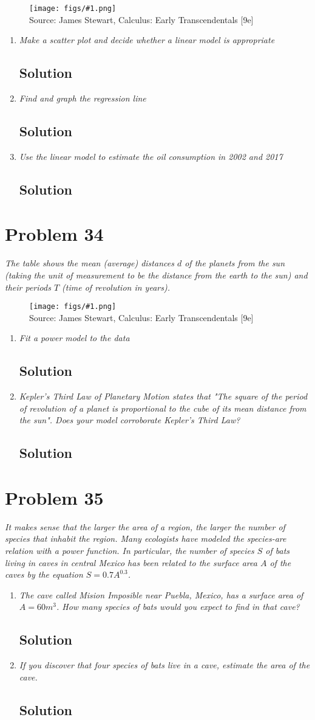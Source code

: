 \documentclass[11pt]{article}
\newcommand{\soln}{\subsection*}
\newcommand{\qn}{\textit}
\newcommand{\imagesource}[1]{{\footnotesize Source: #1}}
\newcommand{\imgqn}[1]{
	\begin{figure}[H]
		\centering
		\texttt{[image: figs/\#1.png]}\\
		\imagesource{James Stewart, Calculus: Early Transcendentals [9e]}
	\end{figure}
}
\begin{document}
\imgqn{1.2.33}

\begin{enumerate}
	\item \qn{Make a scatter plot and decide whether a linear model is appropriate}
	\soln{Solution}
	
	\item \qn{Find and graph the regression line}
	\soln{Solution}
	
	\item \qn{Use the linear model to estimate the oil consumption in 2002 and 2017}
	\soln{Solution}
\end{enumerate}

\section*{Problem 34}

\qn{The table shows the mean (average) distances $d$ of the planets from the sun (taking the unit of measurement to be the distance from the earth to the sun) and their periods $T$ (time of revolution in years).}

\imgqn{1.2.34}

\begin{enumerate}
	\item \qn{Fit a power model to the data}
	\soln{Solution}
	
	\item \qn{Kepler's Third Law of Planetary Motion states that "The square of the period of revolution of a planet is proportional to the cube of its mean distance from the sun". Does your model corroborate Kepler's Third Law?}
	\soln{Solution}
\end{enumerate}

\section*{Problem 35}

\qn{It makes sense that the larger the area of a region, the larger the number of species that inhabit the region. Many ecologists have modeled the species-are relation with a power function. In particular, the number of species $S$ of bats living in caves in central Mexico has been related to the surface area $A$ of the caves by the equation $S=0.7A^{0.3}$.}

\begin{enumerate}
	\item \qn{The cave called Mision Imposible near Puebla, Mexico, has a surface area of $A=60m^3$. How many species of bats would you expect to find in that cave?}
	\soln{Solution}
	
	\item \qn{If you discover that four species of bats live in a cave, estimate the area of the cave.}
	\soln{Solution}
\end{enumerate}
\end{document}
